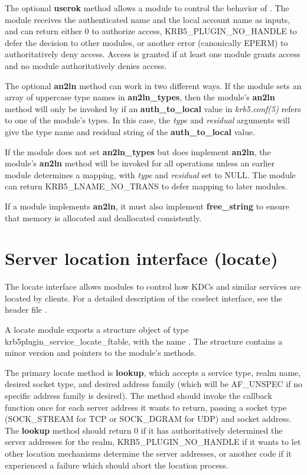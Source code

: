 \documentclass[letterpaper,10pt,english]{sphinxmanual}
\begin{document}
The optional \textbf{userok} method allows a module to control the behavior
of .  The module receives the authenticated name
and the local account name as inputs, and can return either 0 to
authorize access, KRB5\_PLUGIN\_NO\_HANDLE to defer the decision to other
modules, or another error (canonically EPERM) to authoritatively deny
access.  Access is granted if at least one module grants access and no
module authoritatively denies access.

The optional \textbf{an2ln} method can work in two different ways.  If the
module sets an array of uppercase type names in \textbf{an2ln\_types}, then
the module's \textbf{an2ln} method will only be invoked by
 if an \textbf{auth\_to\_local} value in
\emph{krb5.conf(5)} refers to one of the module's types.  In this
case, the \emph{type} and \emph{residual} arguments will give the type name and
residual string of the \textbf{auth\_to\_local} value.

If the module does not set \textbf{an2ln\_types} but does implement
\textbf{an2ln}, the module's \textbf{an2ln} method will be invoked for all
 operations unless an earlier module
determines a mapping, with \emph{type} and \emph{residual} set to NULL.  The
module can return KRB5\_LNAME\_NO\_TRANS to defer mapping to later
modules.

If a module implements \textbf{an2ln}, it must also implement
\textbf{free\_string} to ensure that memory is allocated and deallocated
consistently.


\section{Server location interface (locate)}
\label{plugindev/locate:server-location-interface-locate}\label{plugindev/locate::doc}
The locate interface allows modules to control how KDCs and similar
services are located by clients.  For a detailed description of the
ccselect interface, see the header file .

A locate module exports a structure object of type
krb5plugin\_service\_locate\_ftable, with the name .
The structure contains a minor version and pointers to the module's
methods.

The primary locate method is \textbf{lookup}, which accepts a service type,
realm name, desired socket type, and desired address family (which
will be AF\_UNSPEC if no specific address family is desired).  The
method should invoke the callback function once for each server
address it wants to return, passing a socket type (SOCK\_STREAM for TCP
or SOCK\_DGRAM for UDP) and socket address.  The \textbf{lookup} method
should return 0 if it has authoritatively determined the server
addresses for the realm, KRB5\_PLUGIN\_NO\_HANDLE if it wants to let
other location mechanisms determine the server addresses, or another
code if it experienced a failure which should abort the location
process.
\end{document}
